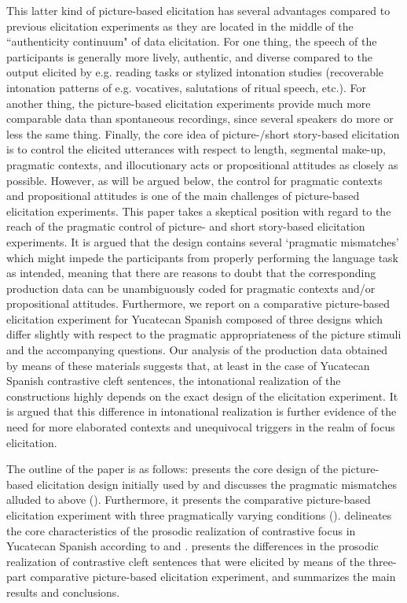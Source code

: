 \documentclass[output=paper]{langsci/langscibook}
\begin{document}
This latter kind of picture-based elicitation has several advantages compared to previous elicitation experiments as they are located in the middle of the ``authenticity continuum" of data elicitation. For one thing, the speech of the participants is generally more lively, authentic, and diverse compared to the output elicited by e.g. reading tasks or stylized intonation studies (recoverable intonation patterns of e.g. vocatives, salutations of ritual speech, etc.). For another thing, the picture-based elicitation experiments provide much more comparable data than spontaneous recordings, since several speakers do more or less the same thing. Finally, the core idea of picture-/short story-based elicitation is to control the elicited utterances with respect to length, segmental make-up, pragmatic contexts, and illocutionary acts or propositional attitudes as closely as possible. However, as will be argued below, the control for pragmatic contexts and propositional attitudes is one of the main challenges of picture-based elicitation experiments. This paper takes a skeptical position with regard to the reach of the pragmatic control of picture- and short story-based elicitation experiments. It is argued that the design contains several ‘pragmatic mismatches’ which might impede the participants from properly performing the language task as intended, meaning that there are reasons to doubt that the corresponding production data can be unambiguously coded for pragmatic contexts and/or propositional attitudes. Furthermore, we report on a comparative picture-based elicitation experiment for Yucatecan Spanish composed of three designs which differ slightly with respect to the pragmatic appropriateness of the picture stimuli and the accompanying questions. Our analysis of the production data obtained by means of these materials suggests that, at least in the case of Yucatecan Spanish contrastive cleft sentences, the intonational realization of the constructions highly depends on the exact design of the elicitation experiment. It is argued that this difference in intonational realization is further evidence of the need for more elaborated contexts and unequivocal triggers in the realm of focus elicitation. 

The outline of the paper is as follows:  presents the core design of the picture-based elicitation design initially used by \citet{Gabriel2007} and discusses the pragmatic mismatches alluded to above (). Furthermore, it presents the comparative picture-based elicitation experiment with three pragmatically varying conditions ().  delineates the core characteristics of the prosodic realization of contrastive focus in Yucatecan Spanish according to \citet{GriceUth15} and \citet{Uth16}.  presents the differences in the prosodic realization of contrastive cleft sentences that were elicited by means of the three-part comparative picture-based elicitation experiment, and  summarizes the main results and conclusions.
\end{document}
